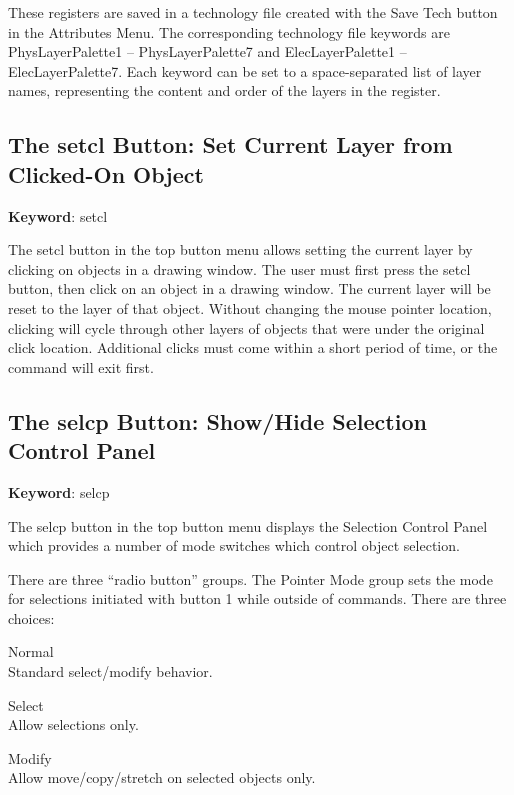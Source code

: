 These registers are saved in a technology file created with the {\cb
Save Tech} button in the {\cb Attributes Menu}.  The corresponding
technology file keywords are {\vt PhysLayerPalette1} -- {\vt
PhysLayerPalette7} and {\vt ElecLayerPalette1} -- {\vt
ElecLayerPalette7}.  Each keyword can be set to a space-separated list
of layer names, representing the content and order of the layers in
the register.

\subsection{The {\cb setcl} Button: Set Current Layer from Clicked-On Object}

{\bf Keyword}: {\vt setcl}

The {\cb setcl} button in the top button menu allows setting the
current layer by clicking on objects in a drawing window.  The user
must first press the {\cb setcl} button, then click on an object in a
drawing window.  The current layer will be reset to the layer of that
object.  Without changing the mouse pointer location, clicking will
cycle through other layers of objects that were under the original
click location.  Additional clicks must come within a short period of
time, or the command will exit first.

\subsection{The {\cb selcp} Button: Show/Hide Selection Control Panel}
\label{selcontrol}

{\bf Keyword}: {\vt selcp}

The {\cb selcp} button in the top button menu displays the {\cb
Selection Control Panel} which provides a number of mode switches
which control object selection.

There are three ``radio button'' groups.  The {\cb Pointer Mode} group
sets the mode for selections initiated with button 1 while outside
of commands.  There are three choices:

\begin{description}
\item{\et Normal}\\ Standard select/modify behavior.
\item{\et Select}\\ Allow selections only.
\item{\et Modify}\\ Allow move/copy/stretch on selected objects only.
\end{description}

